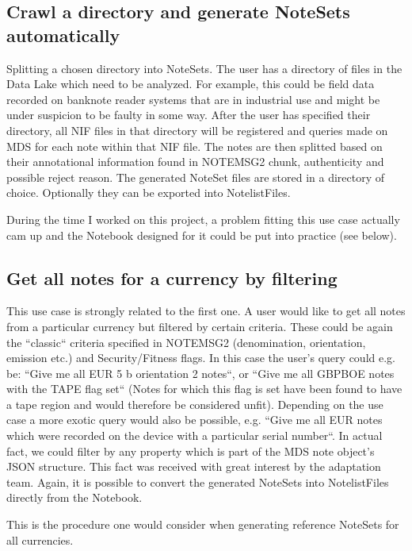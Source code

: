\subsection{Crawl a directory and generate NoteSets automatically}
\label{subsection:crawl_dir}
Splitting a chosen directory into NoteSets. The user has a directory of files in the Data Lake which need to be analyzed. For example, this could be field data recorded on banknote reader systems that are in industrial use and might be under suspicion to be faulty in some way. After the user has specified their directory, all NIF files in that directory will be registered and queries made on MDS for each note within that NIF file. The notes are then splitted based on their annotational information found in NOTEMSG2 chunk, authenticity and possible reject reason. The generated NoteSet files are stored in a directory of choice. Optionally they can be exported into NotelistFiles.\par
During the time I worked on this project, a problem fitting this use case actually cam up and the Notebook designed for it could be put into practice (see below).
\subsection{Get all notes for a currency by filtering}
This use case is strongly related to the first one. A user would like to get all notes from a particular currency but filtered by certain criteria. These could be again the ``classic`` criteria specified in NOTEMSG2 (denomination, orientation, emission etc.) and Security/Fitness flags. In this case the user's query could e.g. be: ``Give me all EUR 5 b orientation 2 notes``, or ``Give me all GBPBOE notes with the TAPE flag set`` (Notes for which this flag is set have been found to have a tape region and would therefore be considered unfit). Depending on the use case a more exotic query would also be possible, e.g. ``Give me all EUR notes which were recorded on the device with a particular serial number``. In actual fact, we could filter by any property which is part of the MDS note object's JSON structure. This fact was received with great interest by the adaptation team. Again, it is possible to convert the generated NoteSets into NotelistFiles directly from the Notebook.\par
This is the procedure one would consider when generating reference NoteSets for all currencies.
